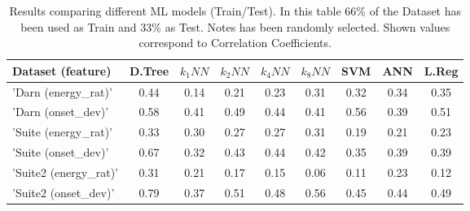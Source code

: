 \begin{table}
\centering
\caption[Results comparing different ML models (Train/Test)]{Results comparing different ML models (Train/Test). In this table 66\% of the Dataset has been used as Train and 33\% as Test. Notes has been randomly selected. Shown values correspond to Correlation Coefficients.}
\label{tab:results_ml_tt}
\footnotesize

\begin{tabular} {lcccccccc}
\\ \hline
Dataset (feature) & D.Tree& $k_1NN$ & $k_2NN$ & $k_4NN$ & $k_8NN$ & SVM & ANN & L.Reg \\ \hline
'Darn (energy\_rat)' & 0.44 & 0.14  & 0.21  & 0.23  & 0.31  & 0.32  & 0.34  & 0.35 \\
'Darn (onset\_dev)' & 0.58 & 0.41  & 0.49  & 0.44  & 0.41  & 0.56  & 0.39  & 0.51 \\
'Suite (energy\_rat)' & 0.33 & 0.30  & 0.27  & 0.27  & 0.31  & 0.19  & 0.21  & 0.23 \\
'Suite (onset\_dev)' & 0.67 & 0.32  & 0.43  & 0.44  & 0.42  & 0.35  & 0.39  & 0.39 \\
'Suite2 (energy\_rat)' & 0.31 & 0.21  & 0.17  & 0.15  & 0.06  & 0.11  & 0.23  & 0.12 \\
'Suite2 (onset\_dev)' & 0.79 & 0.37  & 0.51  & 0.48  & 0.56  & 0.45  & 0.44  & 0.49 \\

\hline
\end{tabular}


\footnotesize

\end{table}
